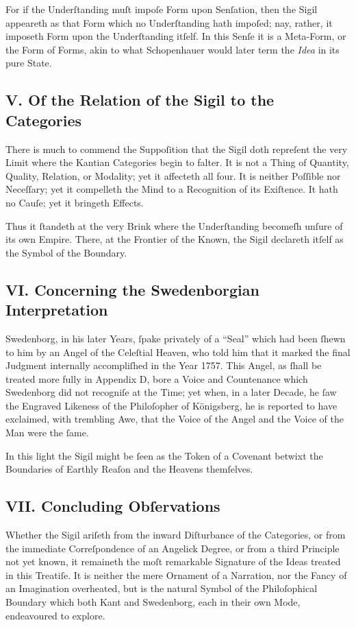 \documentclass[12pt]{article}
\begin{document}
For if the Underſtanding muſt impoſe Form upon Senſation, then the Sigil 
appeareth as that Form which no Underſtanding hath impoſed; nay, rather, it 
imposeth Form upon the Underſtanding itſelf. In this Senſe it is a Meta-Form, 
or the Form of Forms, akin to what Schopenhauer would later term the \textit{Idea} 
in its pure State.

\subsection*{V. Of the Relation of the Sigil to the Categories}
There is much to commend the Suppoſition that the Sigil doth repreſent the 
very Limit where the Kantian Categories begin to falter. It is not a Thing of 
Quantity, Quality, Relation, or Modality; yet it affecteth all four. It is 
neither Poſſible nor Neceſſary; yet it compelleth the Mind to a Recognition of 
its Exiſtence. It hath no Cauſe; yet it bringeth Effects.

Thus it ſtandeth at the very Brink where the Underſtanding becomeſh unſure of 
its own Empire. There, at the Frontier of the Known, the Sigil declareth itſelf 
as the Symbol of the Boundary.

\subsection*{VI. Concerning the Swedenborgian Interpretation}
Swedenborg, in his later Years, ſpake privately of a ``Seal'' which had been 
ſhewn to him by an Angel of the Celeſtial Heaven, who told him that it marked 
the final Judgment internally accompliſhed in the Year 1757. This Angel, as 
ſhall be treated more fully in Appendix D, bore a Voice and Countenance which 
Swedenborg did not recogniſe at the Time; yet when, in a later Decade, he 
ſaw the Engraved Likeness of the Philoſopher of Königsberg, he is reported to 
have exclaimed, with trembling Awe, that the Voice of the Angel and the Voice 
of the Man were the ſame.

In this light the Sigil might be ſeen as the Token of a Covenant betwixt the 
Boundaries of Earthly Reaſon and the Heavens themſelves.

\subsection*{VII. Concluding Obſervations}
Whether the Sigil ariſeth from the inward Diſturbance of the Categories, or 
from the immediate Correſpondence of an Angelick Degree, or from a third 
Principle not yet known, it remaineth the moſt remarkable Signature of the 
Ideas treated in this Treatiſe. It is neither the mere Ornament of a 
Narration, nor the Fancy of an Imagination overheated, but is the natural 
Symbol of the Philoſophical Boundary which both Kant and Swedenborg, each in 
their own Mode, endeavoured to explore.
\end{document}
